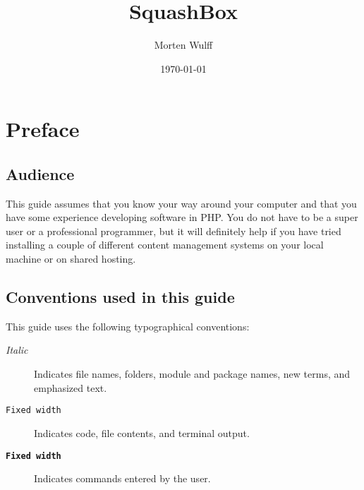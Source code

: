 \documentclass[draft,ebook,10pt,twoside,openright]{memoir}
\title{SquashBox}
\author{Morten Wulff}
\date{\today}
\begin{document}
\frontmatter

\squashboxhalftitlepage{\thetitle}



\begingroup
{}
\tableofcontents*
\endgroup

\chapter{Preface}

\section*{Audience}

This guide assumes that you know your way around your computer and that you have some experience developing software in PHP. You do not have to be a super user or a professional programmer, but it will definitely help if you have tried installing a couple of different content management systems on your local machine or on shared hosting.


\section*{Conventions used in this guide}

\begingroup
\setlength{\parindent}{0pt}

This guide uses the following typographical conventions:

\begin{squashboxsnugshade}
\begin{description}
\item[\normalfont\emph{Italic}] Indicates file names, folders, module and package names, new terms, and emphasized text.
\item[\normalfont\texttt{Fixed width}] Indicates code, file contents, and terminal output.
\item[\normalfont\textbf{\texttt{Fixed width}}] Indicates commands entered by the user.
\end{description}
\end{squashboxsnugshade}
\end{document}
